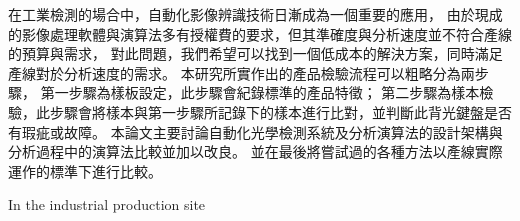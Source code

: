 \begin{abstractzh}
在工業檢測的場合中，自動化影像辨識技術日漸成為一個重要的應用，
由於現成的影像處理軟體與演算法多有授權費的要求，但其準確度與分析速度並不符合產線的預算與需求，
對此問題，我們希望可以找到一個低成本的解決方案，同時滿足產線對於分析速度的需求。
本研究所實作出的產品檢驗流程可以粗略分為兩步驟，
第一步驟為樣板設定，此步驟會紀錄標準的產品特徵；
第二步驟為樣本檢驗，此步驟會將樣本與第一步驟所記錄下的樣本進行比對，並判斷此背光鍵盤是否有瑕疵或故障。
本論文主要討論自動化光學檢測系統及分析演算法的設計架構與分析過程中的演算法比較並加以改良。
並在最後將嘗試過的各種方法以產線實際運作的標準下進行比較。

\end{abstractzh}

\begin{abstracten}
In the industrial production site
\end{abstracten}




